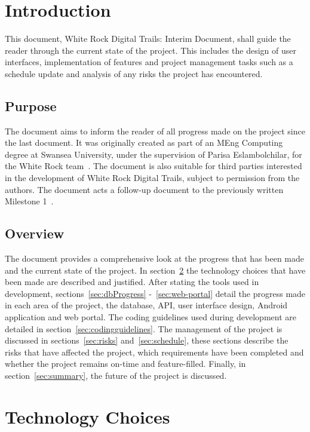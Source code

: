 \documentclass[11pt,a4paper]{article}
\begin{document}


\newpage
\setcounter{page}{1}
\tableofcontents

\newpage
\setcounter{page}{1}
\section{Introduction}
This document, White Rock Digital Trails: Interim Document, shall guide the reader through the current state of the project. This includes the design of user interfaces, implementation of features and project management tasks such as a schedule update and analysis of any risks the project has encountered.
\subsection{Purpose}
The document aims to inform the reader of all progress made on the project since the last document. It was originally created as part of an MEng Computing degree at Swansea University, under the supervision of Parisa Eslambolchilar, for the White Rock team~\cite{whiterock}. The document is also suitable for third parties interested in the development of White Rock Digital Trails, subject to permission from the authors. The document acts a follow-up document to the previously written Milestone 1~\cite{initialDoc}.
\subsection{Overview}
The document provides a comprehensive look at the progress that has been made and the current state of the project. In section~\ref{sec:techChoice} the technology choices that have been made are described and justified. After stating the tools used in development, sections~\ref{sec:dbProgress} -~\ref{sec:web-portal} detail the progress made in each area of the project, the database, API, user interface design, Android application and web portal. The coding guidelines used during development are detailed in section~\ref{sec:codingguidelines}. The management of the project is discussed in sections~\ref{sec:risks} and~\ref{sec:schedule}, these sections describe the risks that have affected the project, which requirements have been completed and whether the project remains on-time and feature-filled. Finally, in section~\ref{sec:summary}, the future of the project is discussed.

\section{Technology Choices}
\label{sec:techChoice}
\end{document}
